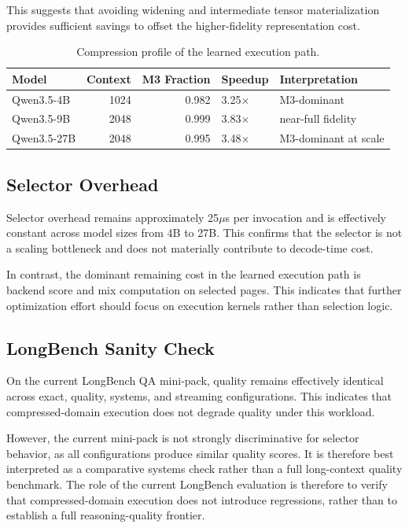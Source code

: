 \documentclass[11pt]{article}
\begin{document}
This suggests that avoiding widening and intermediate tensor materialization provides sufficient savings to offset the higher-fidelity representation cost.

\begin{table}[H]
\centering
\small
\setlength{\tabcolsep}{5pt}
\begin{tabular}{@{}l r r l l@{}}
\toprule
Model & Context & M3 Fraction & Speedup & Interpretation \\
\midrule
Qwen3.5-4B  & 1024 & 0.982 & 3.25$\times$ & M3-dominant \\
Qwen3.5-9B  & 2048 & 0.999 & 3.83$\times$ & near-full fidelity \\
Qwen3.5-27B & 2048 & 0.995 & 3.48$\times$ & M3-dominant at scale \\
\bottomrule
\end{tabular}
\caption{Compression profile of the learned execution path.}
\label{tab:compression_profile}
\end{table}

\subsection{Selector Overhead}

Selector overhead remains approximately 25$\mu$s per invocation and is effectively constant across model sizes from 4B to 27B. This confirms that the selector is not a scaling bottleneck and does not materially contribute to decode-time cost.

In contrast, the dominant remaining cost in the learned execution path is backend score and mix computation on selected pages. This indicates that further optimization effort should focus on execution kernels rather than selection logic.

\subsection{LongBench Sanity Check}

On the current LongBench QA mini-pack, quality remains effectively identical across exact, quality, systems, and streaming configurations. This indicates that compressed-domain execution does not degrade quality under this workload.

However, the current mini-pack is not strongly discriminative for selector behavior, as all configurations produce similar quality scores. It is therefore best interpreted as a comparative systems check rather than a full long-context quality benchmark.  The role of the current LongBench evaluation is therefore to verify that compressed-domain execution does not introduce regressions, rather than to establish a full reasoning-quality frontier.
\end{document}
